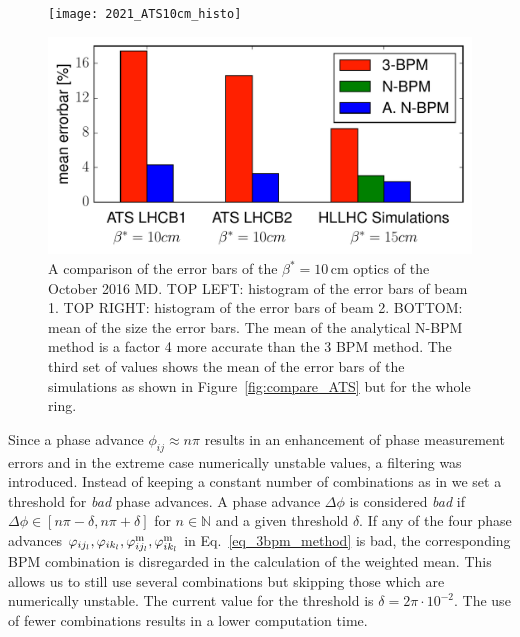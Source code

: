 \begin{figure}
	\centering
    \texttt{[image: 2021\_ATS10cm\_histo]}
	
	\includegraphics[width=.6\linewidth]{mean_errorbars}
	
	\caption{
        A comparison of the error bars of the $ \beta^*=10\,\text{cm} $ optics of the October 2016 MD.
        TOP LEFT: histogram of the error bars of beam 1. TOP RIGHT: histogram of the error bars of beam 2.
        BOTTOM: mean of the size the error bars. The mean of the analytical N-BPM method is a factor
        4 more accurate than the 3 BPM method. The third set of values shows the mean of the error bars
        of the simulations as shown in Figure~\ref{fig:compare_ATS} but for the whole ring.
        }
	\label{fig:HL_report/comparison_errorbars}
\end{figure}
%
Since a phase advance $ \phi_{ij} \approx n\pi $ results in an enhancement of phase measurement errors and in the extreme case numerically unstable values, a filtering was introduced. Instead of keeping a constant number of combinations as in \cite{LangnerNBPM} we set a threshold for \emph{bad} phase advances. A phase advance $ \Delta \phi $ is considered \emph{bad} if $ \Delta \phi \in [ n\pi - \delta, n\pi + \delta ] $ for $ n\in \mathbb{N} $ and a given threshold $ \delta $. If any of the four phase advances $ \varphi_{ij_l}, \varphi_{ik_l},\varphi_{ij_l}^\text{m},\varphi_{ik_l}^\text{m} $ in Eq.~\eqref{eq_3bpm_method} is bad, the corresponding BPM combination is disregarded in the calculation of the weighted mean. This allows us to still use several combinations but skipping those which are numerically unstable. The current value for the threshold is $ \delta = 2\pi \cdot 10^{-2}$. The use of fewer combinations results in a lower computation time. 


